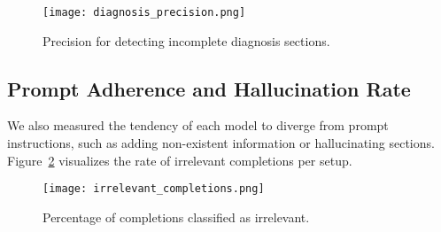 \begin{figure}[H]
  \centering
  \texttt{[image: diagnosis\_precision.png]}
  \caption{Precision for detecting incomplete diagnosis sections.}
  \label{fig:diagnosis_precision}
\end{figure}

\subsection{Prompt Adherence and Hallucination Rate}

We also measured the tendency of each model to diverge from prompt instructions, such as adding non-existent information or hallucinating sections. Figure~\ref{fig:irrelevant_rate} visualizes the rate of irrelevant completions per setup.

\begin{figure}[H]
  \centering
  \texttt{[image: irrelevant\_completions.png]}
  \caption{Percentage of completions classified as irrelevant.}
  \label{fig:irrelevant_rate}
\end{figure}

